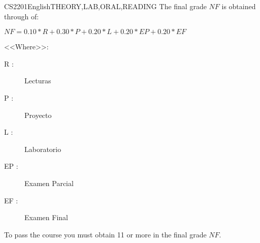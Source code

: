 \begin{evaluation}{CS2201}{English}{THEORY,LAB,ORAL,READING}
The final grade $NF$ is obtained through of:

  $ NF =  0.10*R + 0.30*P + 0.20*L + 0.20*EP + 0.20*EF $

<<Where>>:
  \begin{description}
    \item[R :] Lecturas
		\item[P :] Proyecto
		\item[L :] Laboratorio
    \item[EP :] Examen Parcial
    \item[EF :] Examen Final
	\end{description}

	To pass the course you must obtain 11 or more in the final grade $NF$.
\end{evaluation}
